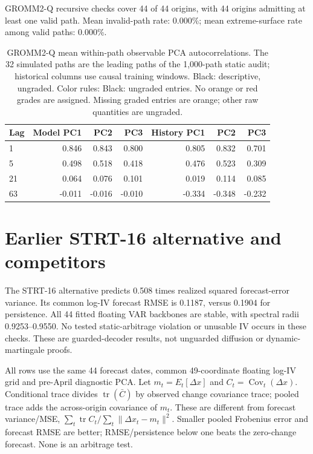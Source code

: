 \documentclass[11pt]{article}
\begin{document}
GROMM2-Q recursive checks cover 44 of 44 origins, with 44 origins admitting at least one valid path. Mean invalid-path rate: 0.000\%; mean extreme-surface rate among valid paths: 0.000\%.

\begin{table}[H]\centering\small\setlength{\tabcolsep}{4pt}
\caption{GROMM2-Q mean within-path observable PCA autocorrelations. The 32 simulated paths are the leading paths of the 1,000-path static audit; historical columns use causal training windows. Black: descriptive, ungraded. Color rules: Black: ungraded entries. No orange or red grades are assigned. Missing graded entries are orange; other raw quantities are ungraded.}\label{tab:gromm2-q-acf}
\begin{tabular}{@{}lrrrrrr@{}}
\toprule
Lag & Model PC1 & PC2 & PC3 & History PC1 & PC2 & PC3 \\
\midrule
1 & 0.846 & 0.843 & 0.800 & 0.805 & 0.832 & 0.701 \\
5 & 0.498 & 0.518 & 0.418 & 0.476 & 0.523 & 0.309 \\
21 & 0.064 & 0.076 & 0.101 & 0.019 & 0.114 & 0.085 \\
63 & -0.011 & -0.016 & -0.010 & -0.334 & -0.348 & -0.232 \\
\bottomrule\end{tabular}\end{table}

\begingroup\color{blue}

\section{Earlier STRT-16 alternative and competitors}

The STRT-16 alternative predicts 0.508 times realized squared forecast-error variance. Its common log-IV forecast RMSE is 0.1187, versus 0.1904 for persistence. All 44 fitted floating VAR backbones are stable, with spectral radii 0.9253--0.9550. No tested static-arbitrage violation or unusable IV occurs in these checks. These are guarded-decoder results, not unguarded diffusion or dynamic-martingale proofs.

All rows use the same 44 forecast dates, common 49-coordinate floating log-IV grid and pre-April diagnostic PCA. Let $m_t=E_t[\Delta x]$ and $C_t=\operatorname{Cov}_t(\Delta x)$. Conditional trace divides $\operatorname{tr}(\bar C)$ by observed change covariance trace; pooled trace adds the across-origin covariance of $m_t$. These are different from forecast variance/MSE, $\sum_t\operatorname{tr}C_t/\sum_t\|\Delta x_t-m_t\|^2$. Smaller pooled Frobenius error and forecast RMSE are better; RMSE/persistence below one beats the zero-change forecast. None is an arbitrage test.
\end{document}
